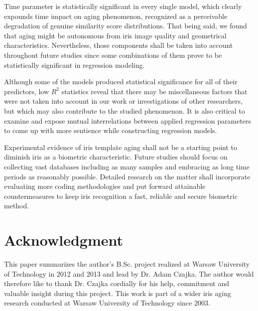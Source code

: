 \documentclass{article}
\begin{document}
Time parameter is statistically significant in every single model, which clearly expounds time impact on aging phenomenon, recognized as a perceivable degradation of genuine similarity score distributions. That being said, we found that aging might be autonomous from iris image quality and geometrical characteristics. Nevertheless, those components shall be taken into account throughout future studies since some combinations of them prove to be statistically significant in regression modeling.
		
Although some of the models produced statistical significance for all of their predictors, low $R^2$ statistics reveal that there may be miscellaneous factors that were not taken into account in our work or investigations of other researchers, but which may also contribute to the studied phenomenon. It is also critical to examine and expose mutual interrelations between applied regression parameters to come up with more sentience while constructing regression models.
		
Experimental evidence of iris template aging shall not be a starting point to diminish iris as a biometric characteristic. Future studies should focus on collecting vast databases including as many samples and embracing as long time periods as reasonably possible. Detailed research on the matter shall incorporate evaluating more coding methodologies and put forward attainable countermeasures to keep iris recognition a fast, reliable and secure biometric method.

\section{Acknowledgment}
This paper summarizes the author's B.Sc. project realized at Warsaw University of Technology in 2012 and 2013 and lead by Dr. Adam Czajka. The author would therefore like to thank Dr. Czajka cordially for his help, commitment and valuable insight during this project. This work is part of a wider iris aging research conducted at Warsaw University of Technology since 2003.



\end{document}
